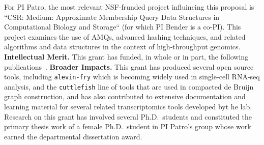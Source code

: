For PI Patro, the most relevant NSF-frunded project influincing this proposal is ``CSR: Medium: Approximate Membership Query Data Structures in Computational Biology and Storage`` (for which PI Bender is a co-PI).  This project examines the use of AMQs, advanced hashing techniques, and related algorithms and data structures in the context of high-throughput genomics.
\textbf{Intellectual Merit.} This grant has funded, in whole or in part, the following publications~\cite{Khan2021,Khan2022,Khan2023CapsSA,Almodaresi2021,almodaresi2022incrementally,he2022alevin,Srivastava2019,fan2023fulgor,fan2023spt,skoufos2022agamemnon,singh2023treeterminus,He2023,Pibiri2023MacDBG,wu2023seesaw,Karami2023,He2023Ambiguity,Fan2022Perplexity,Mu2022Airpart,AlmodaresiPFJP19,Soneson2021,Srivastava2020AlnMap,Srivastava2020BayesianSharing,Sarkar2020Terminus,Love2020Tximeta,Marais2019Sketching,VandenBerge2019,Zhu2019,Zakeri2021LikeForLike,Sarkar2019Minnow,VanBuren2021}.
\textbf{Broader Impacts.} This grant has produced several open source tools, including \texttt{alevin-fry} which is becoming widely used in single-cell RNA-seq analysis, and the \texttt{cuttlefish} line of tools that are used in compacted de Bruijn graph construction, and has also contributed to extensive documentation and learning material for several related transcriptomics tools developed byt he lab. Research on this grant has involved several Ph.D.\ students and constituted the primary thesis work of a female Ph.D.\ student in PI Patro's group whose work earned the departmental dissertation award. 